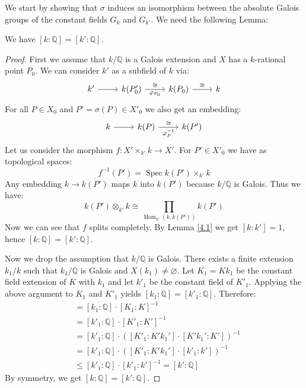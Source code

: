 We start by showing that $\sigma$ induces an isomorphism between the absolute Galois groups of the constant fields $G_k$ and $G_{k'}$. We need the following Lemma:

\begin{lemma}\label{4.2-pre}
We have $[k:\mathbb{Q}] = [k':\mathbb{Q}]$.
\end{lemma}

\begin{proof}
First we assume that $k/\mathbb{Q}$ is a Galois extension and $X$ has a $k$-rational point $P_0$. We can consider $k'$ as a subfield of $k$ via: 
\[\begin{tikzcd}
k'\ar[r] & k(P'_0)\ar[r, "\varphi_{P_0}"', "\cong"] & k(P_0) \ar[r, "\cong"] & k
\end{tikzcd}\]
For all $P\in X_0$ and $P'=\sigma(P)\in X'_0$ we also get an embedding:
\[ \begin{tikzcd}
k \ar[r] & k(P) \ar[r, "\varphi_P^{-1}"', "\cong"] & k(P')
\end{tikzcd} \]
Let us consider the morphism $f:X'\times_{k'} k\to X'$. For $P'\in X'_0$ we have as topological spaces:
\[ f^{-1}(P') = \operatorname{Spec} k(P')\times_{k'} k \]
Any embedding $k\to \overline{k(P')}$ maps $k$ into $k(P')$ because $k/\mathbb{Q}$ is Galois. Thus we have:
\[ k(P')\otimes_{k'} k\cong \prod_{\operatorname{Hom}_{k'}(k, k(P'))} k(P') \]
Now we can see that $f$ splits completely. By Lemma \ref{4.1} we get $[k:k'] = 1$, hence $[k:\mathbb{Q}]= [k':\mathbb{Q}]$.

Now we drop the assumption that $k/\mathbb{Q}$ is Galois. There exists a finite extension $k_1/k$ such that $k_1/\mathbb{Q}$ is Galois and $X(k_1)\neq\varnothing$. Let $K_1 = Kk_1$ be the constant field extension of $K$ with $k_1$ and let $k'_1$ be the constant field of $K'_1$. Applying the above argument to $K_1$ and $K'_1$ yields $[k_1:\mathbb{Q}] = [k'_1:\mathbb{Q}]$. Therefore:
\begin{align*}
[k:\mathbb{Q}] &= [k_1:\mathbb{Q}]\cdot [K_1:K]^{-1} \\
&= [k'_1:\mathbb{Q}]\cdot [K'_1:K']^{-1}\\
&= [k'_1:\mathbb{Q}]\cdot ([K'_1: K'k_1'] \cdot [K'k_1':K'])^{-1}\\
&= [k'_1:\mathbb{Q}]\cdot  ([K'_1: K'k_1'] \cdot [k'_1:k'])^{-1} \\
&\leq [k'_1:\mathbb{Q}]\cdot [k'_1:k']^{-1} = [k':\mathbb{Q}]
\end{align*}
By symmetry, we get $[k:\mathbb{Q}] = [k':\mathbb{Q}]$.
\end{proof}

